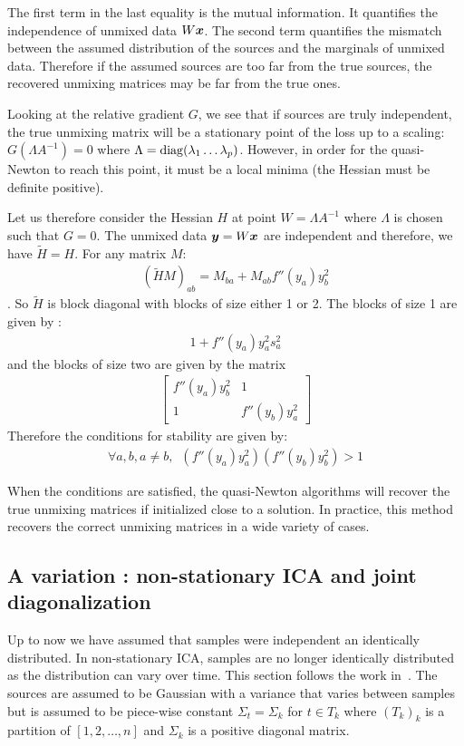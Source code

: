 The first term in the last equality is the mutual information. It quantifies the
independence of unmixed data $W \boldsymbol{x}$. The second term quantifies the mismatch
between the assumed distribution of the sources and the marginals of unmixed data.
Therefore if the assumed sources are too far from the true sources, the
recovered unmixing matrices may be far from the true ones.


Looking at the relative gradient $G$, we see that if sources are truly
independent, the true unmixing matrix will be a stationary point of the loss up
to a scaling: $G(\Lambda A^{-1})=0$ where $\Lambda=\operatorname*{diag}(\lambda_1 \dots \lambda_p)$.
However, in order for the quasi-Newton to reach this point, it must be a local
minima (the Hessian must be definite positive). 

Let us therefore consider the Hessian $H$ at point $W = \Lambda A^{-1}$ where
$\Lambda$ is chosen such that $G = 0$. The unmixed data $\boldsymbol{y} = W \boldsymbol{x}$ are independent and
therefore, we have $\tilde{H} = H$.
For any matrix $M$:
\begin{align}(\tilde{H} M)_{ab} = M_{ba} + M_{ab} f''(y_a)y_b^2
\end{align}.
So $\tilde{H}$ is block diagonal with blocks of size either 1 or 2.
The blocks of size 1 are given by :
\begin{align}
  1 + f''(y_a) y_a^2
  s_a^2
\end{align}
and the blocks of size
two are given by the matrix
\begin{align}
                              \begin{bmatrix} f''(y_a) y_b^2
  & 1 \\ 1 &
  f''(y_b)y_a^2 \end{bmatrix}
\end{align}
Therefore the conditions for stability are given by:
\begin{align}
  \forall a, b, a \neq b, \enspace \left(f''(y_a) y_a^2 \right) \left(f''(y_b)  y_b^2 \right) > 1
\end{align}

When the conditions are satisfied, the quasi-Newton algorithms will recover the
true unmixing matrices if initialized close to a solution. In practice, this
method recovers the correct unmixing matrices in a wide variety of cases.

\subsection{A variation : non-stationary ICA and joint diagonalization}
Up to now we have assumed that samples were independent an identically distributed. In non-stationary ICA, samples are no longer identically distributed as the distribution can vary over time.
This section follows the work in~\cite{pham2001blind}.
The sources are assumed to be Gaussian with a variance that varies between
samples but is assumed to be piece-wise constant $\Sigma_t = \Sigma_k$ for $t \in
T_k$ where $(T_k)_k$ is a partition of $[1, 2, \dots, n]$ and $\Sigma_k$ is a
positive diagonal matrix.


